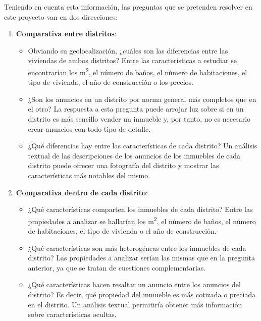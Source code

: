 \documentclass[12pt]{article}
\begin{document}
Teniendo en cuenta esta información, las preguntas que se pretenden resolver en este proyecto van en dos direcciones:
\begin{enumerate}[topsep=0cm,partopsep=0cm,wide]
	\item \textbf{Comparativa entre distritos}: 
		\begin{itemize}[topsep=0cm,partopsep=0cm]
			\item Obviando su geolocalización, ¿cuáles son las diferencias entre las viviendas de ambos distritos? Entre las características a estudiar se encontrarían los m\textsuperscript{2}, el número de baños, el número de habitaciones, el tipo de vivienda, el año de construcción o los precios.
			
			\item ¿Son los anuncios en un distrito por norma general más completos que en el otro? La respuesta a esta pregunta puede arrojar luz sobre si en un distrito es más sencillo vender un inmueble y, por tanto, no es necesario crear anuncios con todo tipo de detalle.
			
			\item ¿Qué diferencias hay entre las características de cada distrito? Un análisis textual de las descripciones de los anuncios de los inmuebles de cada distrito puede ofrecer una fotografía del distrito y mostrar las características más notables del mismo.
		\end{itemize}
	
	\item \textbf{Comparativa dentro de cada distrito}:
		\begin{itemize}[topsep=0cm,partopsep=0cm]
			\item ¿Qué características comparten los inmuebles de cada distrito? Entre las propiedades a analizar se hallarían los m\textsuperscript{2}, el número de baños, el número de habitaciones, el tipo de vivienda o el año de construcción.
			
			\item ¿Qué características son más heterogéneas entre los inmuebles de cada distrito? Las propiedades a analizar serían las mismas que en la pregunta anterior, ya que se tratan de cuestiones complementarias.
			
			\item ¿Qué características hacen resaltar un anuncio entre los anuncios del distrito? Es decir, qué propiedad del inmueble es más cotizada o preciada en el distrito. Un análisis textual permitiría obtener más información sobre características ocultas.
		\end{itemize}

\end{enumerate}
\end{document}
